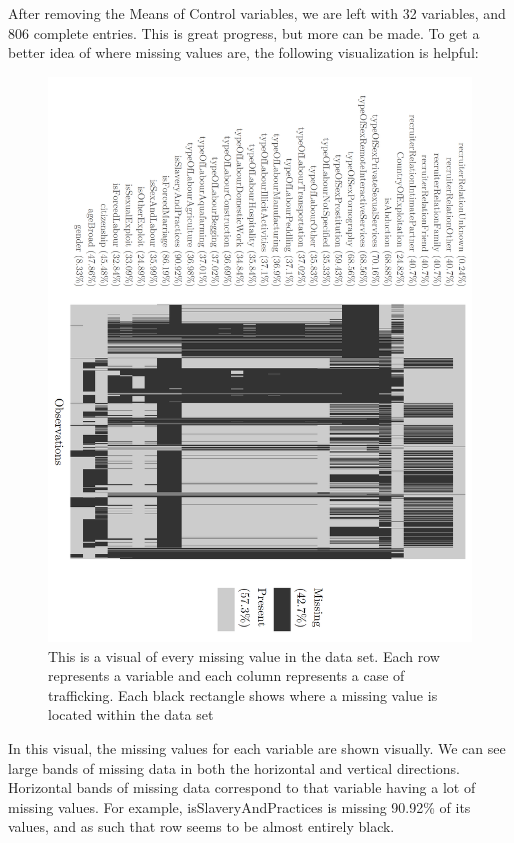 \documentclass{article} %
\begin{document}
	After removing the Means of Control variables, we are left with 32 variables, and 806 complete entries. This is great progress, but more can be made. To get a better idea of where missing values are, the following visualization is helpful:
	
	\FloatBarrier
	\begin{figure}[H]
		\hspace*{-2cm}
		\includegraphics[height = 1.4\textwidth, angle = 90]{NaniarVis1}
		\caption[]{This is a visual of every missing value in the data set. Each row represents a variable and each column represents a case of trafficking. Each black rectangle shows where a missing value is located within the data set}
		\label{fig:Naniar}
	\end{figure}
	\FloatBarrier
In this visual, the missing values for each variable are shown visually. We can see large bands of missing data in both the horizontal and vertical directions. Horizontal bands of missing data correspond to that variable having a lot of missing values. For example, isSlaveryAndPractices is missing 90.92\% of its values, and as such that row seems to be almost entirely black. 
\end{document}
